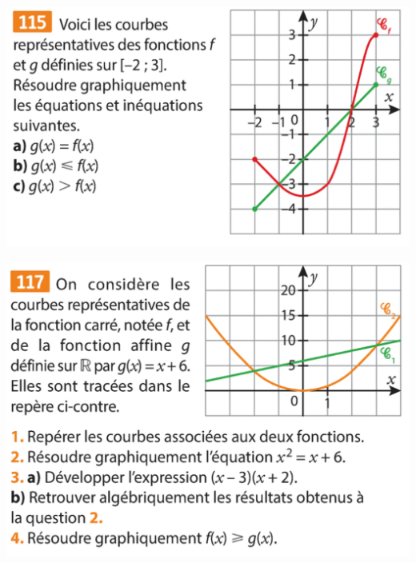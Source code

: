 \documentclass{article}
\begin{document}
\vspace*{0.5cm}
\begin{minipage}{0.45\textwidth}
\begin{center}
\includegraphics[width=\textwidth]{Exercice_5.png}
\end{center}    
\end{minipage}
\hfill\vline\hfill
\begin{minipage}{0.45\textwidth}
\includegraphics[width=\textwidth]{Exercice_6.png}
\end{minipage}
\end{document}
